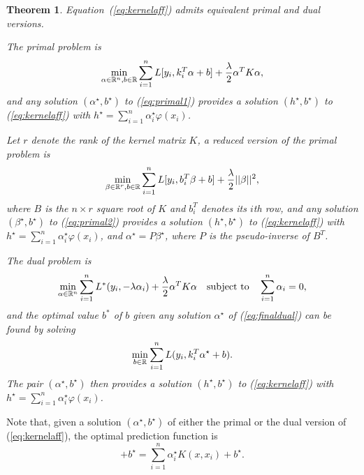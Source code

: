 \documentclass[12pt,letterpaper]{article}
\newtheorem{theorem}{Theorem}
\begin{document}
\begin{theorem}\label{th:affinelearn}
Equation~(\ref{eq:kernelaff}) admits equivalent primal and dual
versions.
 
The primal problem is
\begin{equation}
\min_{\alpha\in\mathbb{R}^n,b\in\mathbb{R}} \sum_{i=1}^n L[y_i,k_i^T\alpha+b]
+\frac{\lambda}{2}\alpha^TK\alpha,
\label{eq:primal1}
\end{equation}
and any solution $(\alpha^\star,b^\star)$ to (\ref{eq:primal1})
provides
a solution $(h^\star,b^\star)$ to (\ref{eq:kernelaff}) with
$h^\star=\sum_{i=1}^n \alpha_i^\star\varphi(x_i)$.
 
Let $r$ denote the rank of the kernel matrix $K$, a
{\em reduced} version of the primal problem is
\begin{equation}
\min_{\beta\in\mathbb{R}^r,b\in\mathbb{R}} \sum_{i=1}^n L[y_i,b_i^T\beta+b]
+\frac{\lambda}{2}||\beta||^2,
\label{eq:primal2}
\end{equation}
where $B$ is the $n\times r$ square root of $K$ and $b_i^T$ denotes
its $i$th row,
and any solution $(\beta^\star,b^\star)$ to (\ref{eq:primal2})
provides
a solution $(h^\star,b^\star)$ to (\ref{eq:kernelaff}) with
$h^\star=\sum_{i=1}^n \alpha_i^\star\varphi(x_i)$, and
$\alpha^\star=P\beta^\star$, where $P$ is the pseudo-inverse of $B^T$.
 
The dual problem is
\begin{equation}
\min_{\alpha\in\mathbb{R}^n}
\sum_{i=1}^n L^*(y_i,-\lambda\alpha_i)
+\frac{\lambda}{2}\alpha^TK\alpha
\quad\text{subject to}\quad \sum_{i=1}^n \alpha_i=0,
\label{eq:finaldual}
\end{equation}
and the optimal value $b^*$ of $b$ given any solution
$\alpha^\star$ of (\ref{eq:finaldual}) can be found by solving
\begin{equation}
\min_{b\in \mathbb{R}} \sum_{i=1}^n L(y_i,k_i^T\alpha^{\star}+b).
\label{eq:minb}
\end{equation}
The pair $(\alpha^\star,b^\star)$ then provides a solution
$(h^\star,b^\star)$ to (\ref{eq:kernelaff}) with $h^\star=
\sum_{i=1}^n\alpha_i^\star\varphi(x_i)$.
\end{theorem}
 
Note that, given a solution $(\alpha^\star,b^\star)$ of either the
primal or the dual version of (\ref{eq:kernelaff}), the optimal
prediction function is
\begin{equation}
[h^\star|\varphi(x)]+b^\star= \sum_{i=1}^n \alpha_i^{\star} K(x,x_i) +b^\star.
\end{equation}
 
\end{document}
